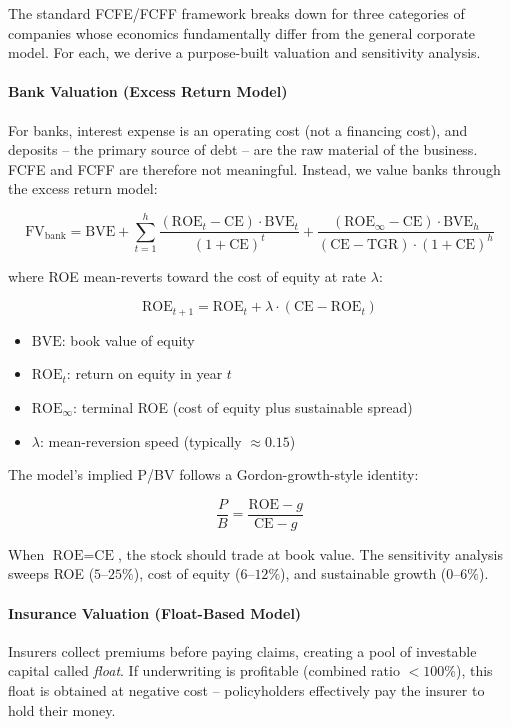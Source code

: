 The standard FCFE/FCFF framework breaks down for three categories of companies whose economics fundamentally differ from the general corporate model. For each, we derive a purpose-built valuation and sensitivity analysis.

\paragraph{Bank Valuation (Excess Return Model)}

For banks, interest expense is an operating cost (not a financing cost), and deposits -- the primary source of debt -- are the raw material of the business. FCFE and FCFF are therefore not meaningful. Instead, we value banks through the excess return model:

$$
\text{FV}_{\text{bank}} = \text{BVE} + \sum_{t=1}^{h} \frac{(\text{ROE}_t - \text{CE}) \cdot \text{BVE}_t}{(1 + \text{CE})^t} + \frac{(\text{ROE}_{\infty} - \text{CE}) \cdot \text{BVE}_{h}}{(\text{CE} - \text{TGR}) \cdot (1 + \text{CE})^h}
$$

where ROE mean-reverts toward the cost of equity at rate $\lambda$:

$$
\text{ROE}_{t+1} = \text{ROE}_t + \lambda \cdot (\text{CE} - \text{ROE}_t)
$$

\begin{itemize}
  \item[] $\text{BVE}$: book value of equity
  \item[] $\text{ROE}_t$: return on equity in year $t$
  \item[] $\text{ROE}_{\infty}$: terminal ROE (cost of equity plus sustainable spread)
  \item[] $\lambda$: mean-reversion speed (typically $\approx 0.15$)
\end{itemize}

The model's implied P/BV follows a Gordon-growth-style identity:

$$
\frac{P}{B} = \frac{\text{ROE} - g}{\text{CE} - g}
$$

When $\text{ROE} = \text{CE}$, the stock should trade at book value. The sensitivity analysis sweeps ROE ($5\text{--}25\%$), cost of equity ($6\text{--}12\%$), and sustainable growth ($0\text{--}6\%$).

\paragraph{Insurance Valuation (Float-Based Model)}

Insurers collect premiums before paying claims, creating a pool of investable capital called \emph{float}. If underwriting is profitable (combined ratio $< 100\%$), this float is obtained at negative cost -- policyholders effectively pay the insurer to hold their money.

